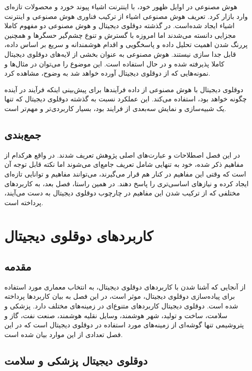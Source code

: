 هوش مصنوعی در اوایل ظهور خود، با اینترنت اشیاء
پیوند خورد و محصولات تازه‌ای وارد بازار کرد. تعریف هوش مصنوعی اشیاء
از ترکیب فناوری هوش مصنوعی و اینترنت اشیاء ایجاد شده‌است. در گذشته دوقلوی دیجیتال و هوش مصنوعی دو مفهوم کاملا مجزایی دانسته می‌شدند اما امروزه با گسترش و تنوع چشم‌گیر حسگر‌ها و همچنین پررنگ شدن اهمیت تحلیل داده‌ و پاسخگویی و اقدام هوشمندانه و سریع بر اساس داده، قابل جدا سازی نیستند. هوش مصنوعی به عنوان بخشی از لایه‌های دوقلوی دیجیتال کاملا پذیرفته شده و در حال استفاده است. این موضوع را می‌توان در مثال‌ها و نمونه‌هایی که از دوقلو‌ی دیجیتال آورده‌ خواهد شد به وضوح، مشاهده کرد.

دوقلوی‌ دیجیتال با هوش مصنوعی از داده‌ فرآیند‌ها برای پیش‌بینی اینکه فرآیند در آینده چگونه خواهد بود، استفاده می‌کند. این عملکرد نسبت به گذشته دوقلوی دیجیتال که تنها یک شبیه‌سازی و نمایش سه‌بعدی از فرایند بود، بسیار کاربردی‌تر و مهم‌تر است.

\section{جمع‌بندی}
در این فصل اصطلاحات و عبارت‌های اصلی پژوهش تعریف شدند. در واقع هرکدام از مفاهیم ذکر شده، خود به تنهایی شامل تعریف جامع‌ای می‌شوند اما نکته قابل توجه آن است که وقتی این مفاهیم در کنار هم قرار می‌گیرند، می‌توانند مفاهیم و توانایی تازه‌ای ایجاد کرده و نیاز‌های اساسی‌تری را پاسخ دهند. در همین راستا، فصل بعد، به کاربرد‌های مختلفی که از ترکیب‌ شدن این مفاهیم در چارچوب دوقلوی دیجیتال به دست می‌آیند، پرداخته است.




\chapter{کاربرد‌های دوقلوی دیجیتال}

\section{مقدمه}
از آنجایی که آشنا شدن با کاربرد‌های دوقلوی دیجیتال، به انتخاب معماری مورد استفاده برای پیاده‌سازی دوقلوی دیجیتال، موثر است، در این فصل به بیان کاربرد‌ها پرداخته شده است.
دوقلوی دیجیتال کاربرد‌های متنوع‌ای در زمینه‌های مختلف دارد. پزشکی و سلامت، ساخت و تولید، شهر هوشمند، وسایل نقلیه هوشمند، صنعت نفت، گاز و پتروشیمی تنها گوشه‌ای از زمینه‌های مورد  استفاده در دوقلوی دیجیتال است که در این فصل تعدادی از این موارد بیان شده است.\cite{b14}
\section{دوقلوی دیجیتال پزشکی‌ و سلامت}

